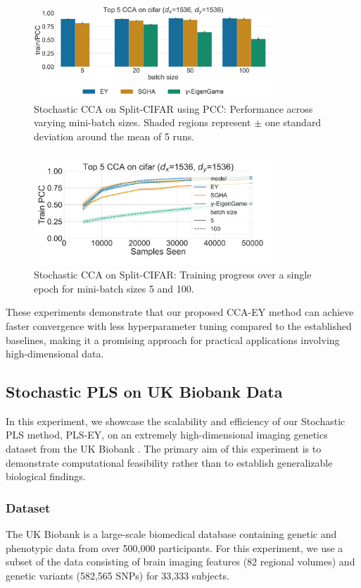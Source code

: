 \begin{figure}
\centering
\includegraphics[width=0.8\textwidth]{figures/CCA/cifar_models_different_batch_sizes}
\caption{Stochastic CCA on Split-CIFAR using PCC: Performance across varying mini-batch sizes. Shaded regions represent $\pm$ one standard deviation around the mean of 5 runs.}
\label{fig:corr_cifar}
\end{figure}
\begin{figure}
\centering
\includegraphics[width=0.8\textwidth]{figures/CCA/cifar_allbatchsizes_pcc}
\caption{Stochastic CCA on Split-CIFAR: Training progress over a single epoch for mini-batch sizes 5 and 100.}
\label{fig:learningcurve_cifar}
\end{figure}
These experiments demonstrate that our proposed CCA-EY method can achieve faster convergence with less hyperparameter tuning compared to the established baselines, making it a promising approach for practical applications involving high-dimensional data.

\subsection{Stochastic PLS on UK Biobank Data}
In this experiment, we showcase the scalability and efficiency of our Stochastic PLS method, PLS-EY, on an extremely high-dimensional imaging genetics dataset from the UK Biobank \citep{sudlow2015uk}. The primary aim of this experiment is to demonstrate computational feasibility rather than to establish generalizable biological findings.

\subsubsection{Dataset}
The UK Biobank is a large-scale biomedical database containing genetic and phenotypic data from over 500,000 participants. For this experiment, we use a subset of the data consisting of brain imaging features (82 regional volumes) and genetic variants (582,565 SNPs) for 33,333 subjects.


